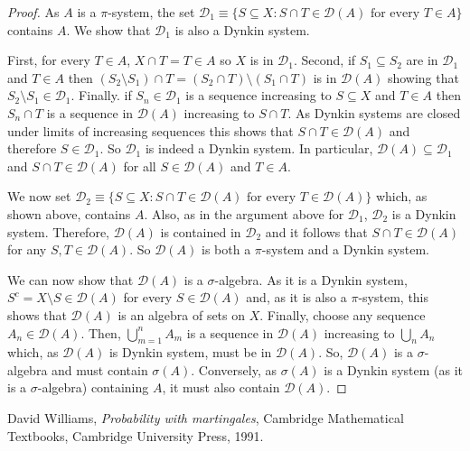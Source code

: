 \documentclass[12pt]{article}
\begin{document}
\begin{proof}
As $A$ is a $\pi$-system, the set $\mathcal{D}_1\equiv\{S\subseteq X:S\cap T\in \mathcal{D}(A)\text{ for every }T\in A\}$ contains $A$. We show that $\mathcal{D}_1$ is also a Dynkin system.

First, for every $T\in A$, $X\cap T=T\in A$ so $X$ is in $\mathcal{D}_1$. Second, if $S_1\subseteq S_2$ are in $\mathcal{D}_1$ and $T\in A$ then $(S_2\setminus S_1)\cap T = (S_2\cap T)\setminus(S_1\cap T)$ is in $\mathcal{D}(A)$ showing that $S_2\setminus S_1\in\mathcal{D}_1$.
Finally. if $S_n\in\mathcal{D}_1$ is a sequence increasing to $S\subseteq X$ and $T\in A$ then $S_n\cap T$ is a sequence in $\mathcal{D}(A)$ increasing to $S\cap T$. As Dynkin systems are closed under limits of increasing sequences this shows that $S\cap T\in\mathcal{D}(A)$ and therefore $S\in\mathcal{D}_1$. So $\mathcal{D}_1$ is indeed a Dynkin system. In particular, $\mathcal{D}(A)\subseteq\mathcal{D}_1$ and $S\cap T\in\mathcal{D}(A)$ for all $S\in\mathcal{D}(A)$ and $T\in A$.

We now set $\mathcal{D}_2\equiv\{S\subseteq X:S\cap T\in\mathcal{D}(A)\text{ for every }T\in\mathcal{D}(A)\}$ which, as shown above, contains $A$. Also, as in the argument above for $\mathcal{D}_1$, $\mathcal{D}_2$ is a Dynkin system. Therefore, $\mathcal{D}(A)$ is contained in $\mathcal{D}_2$ and it follows that $S\cap T\in\mathcal{D}(A)$ for any $S,T\in\mathcal{D}(A)$. So $\mathcal{D}(A)$ is both a $\pi$-system and a Dynkin system.

We can now show that $\mathcal{D}(A)$ is a $\sigma$-algebra. As it is a Dynkin system, $S^c=X\setminus S\in\mathcal{D}(A)$ for every $S\in\mathcal{D}(A)$ and, as it is also a $\pi$-system, this shows that $\mathcal{D}(A)$ is an algebra of sets on $X$. Finally, choose any sequence $A_n\in\mathcal{D}(A)$. Then, $\bigcup_{m=1}^nA_m$ is a sequence in $\mathcal{D}(A)$ increasing to $\bigcup_nA_n$ which, as $\mathcal{D}(A)$ is Dynkin system, must be in $\mathcal{D}(A)$. So, $\mathcal{D}(A)$ is a $\sigma$-algebra and must contain $\sigma(A)$. Conversely, as $\sigma(A)$ is a Dynkin system (as it is a $\sigma$-algebra) containing $A$, it must also contain $\mathcal{D}(A)$.
\end{proof}

\begin{thebibliography}{9}
David Williams, \emph{Probability with martingales},
Cambridge Mathematical Textbooks, Cambridge University Press, 1991.
\end{thebibliography}
\end{document}

